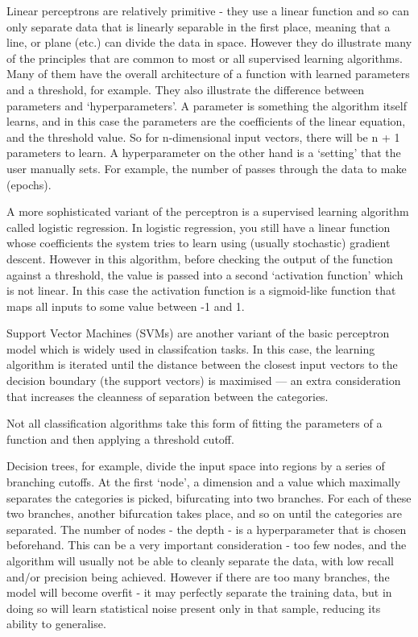 Linear perceptrons are relatively primitive - they use a linear function and so can only separate data that is linearly separable in the first place, meaning that a line, or plane (etc.) can divide the data in space. However they do illustrate many of the principles that are common to most or all supervised learning algorithms. Many of them have the overall architecture of a function with learned parameters and a threshold, for example. They also illustrate the difference between parameters and `hyperparameters'. A parameter is something the algorithm itself learns, and in this case the parameters are the coefficients of the linear equation, and the threshold value. So for n-dimensional input vectors, there will be n + 1 parameters to learn. A hyperparameter on the other hand is a `setting' that the user manually sets. For example, the number of passes through the data to make (epochs).

A more sophisticated variant of the perceptron is a supervised learning algorithm called logistic regression. In logistic regression, you still have a linear function whose coefficients the system tries to learn using (usually stochastic) gradient descent. However in this algorithm, before checking the output of the function against a threshold, the value is passed into a second `activation function' which is not linear. In this case the activation function is a sigmoid-like function that maps all inputs to some value between -1 and 1.

Support Vector Machines (SVMs) are another variant of the basic perceptron model which is widely used in classifcation tasks. In this case, the learning algorithm is iterated until the distance between the closest input vectors to the decision boundary (the support vectors) is maximised --- an extra consideration that increases the cleanness of separation between the categories.

Not all classification algorithms take this form of fitting the parameters of a function and then applying a threshold cutoff.

Decision trees, for example, divide the input space into regions by a series of branching cutoffs. At the first `node', a dimension and a value which maximally separates the categories is picked, bifurcating into two branches. For each of these two branches, another bifurcation takes place, and so on until the categories are separated. The number of nodes - the depth - is a hyperparameter that is chosen beforehand. This can be a very important consideration - too few nodes, and the algorithm will usually not be able to cleanly separate the data, with low recall and/or precision being achieved. However if there are too many branches, the model will become overfit - it may perfectly separate the training data, but in doing so will learn statistical noise present only in that sample, reducing its ability to generalise.

